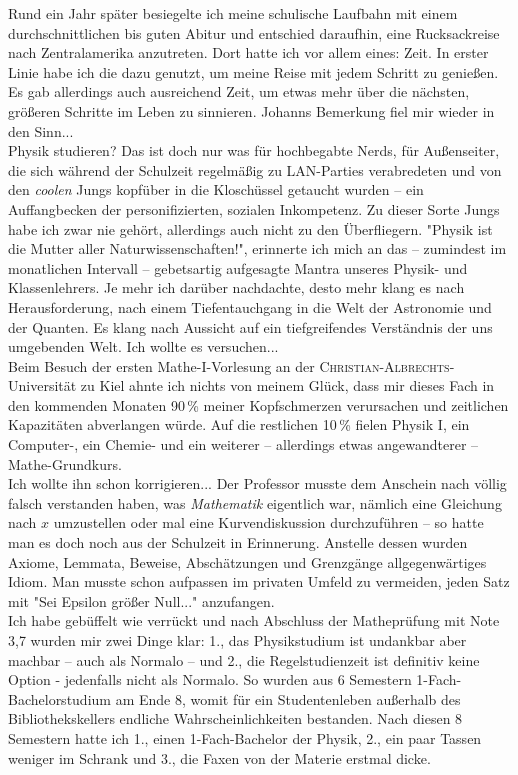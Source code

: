 \begin{multicols}{2}
Rund ein Jahr später besiegelte ich meine schulische Laufbahn mit einem durchschnittlichen bis guten Abitur und entschied daraufhin,
eine Rucksackreise nach Zentralamerika anzutreten.
Dort hatte ich vor allem eines: Zeit. In erster Linie habe ich die dazu genutzt, um meine Reise mit jedem Schritt zu genießen.
Es gab allerdings auch ausreichend Zeit, um etwas mehr über die nächsten, größeren Schritte im Leben zu sinnieren. Johanns Bemerkung fiel mir wieder in den Sinn... \\ 

Physik studieren? Das ist doch nur was für hochbegabte Nerds, für Außenseiter, die sich während der Schulzeit regelmäßig zu LAN-Parties verabredeten und 
von den \textit{coolen} Jungs kopfüber in die Kloschüssel getaucht wurden -- ein Auffangbecken der personifizierten, sozialen Inkompetenz.
Zu dieser Sorte Jungs habe ich zwar nie gehört, allerdings auch nicht zu den Überfliegern.
"Physik ist die Mutter aller Naturwissenschaften!", erinnerte ich mich an das – zumindest im monatlichen Intervall – gebetsartig aufgesagte Mantra unseres
Physik- und Klassenlehrers. Je mehr ich darüber nachdachte, desto mehr klang es nach Herausforderung,
nach einem Tiefentauchgang in die Welt der Astronomie und der Quanten.
Es klang nach Aussicht auf ein tiefgreifendes Verständnis der uns umgebenden Welt. Ich wollte es versuchen... \\ 

Beim Besuch der ersten Mathe-\textsc{I}-Vorlesung an der \textsc{Christian-Albrechts}-Universität zu Kiel ahnte ich nichts von meinem Glück, dass mir dieses Fach in den kommenden Monaten 90\,\% meiner Kopfschmerzen
verursachen und zeitlichen Kapazitäten abverlangen würde.
Auf die restlichen 10\,\% fielen Physik \textsc{I}, ein Computer-, ein Chemie- und ein weiterer – allerdings etwas angewandterer – Mathe-Grundkurs. \\ 

Ich wollte ihn schon korrigieren... Der Professor musste dem Anschein nach völlig falsch verstanden haben, was \textit{Mathematik} eigentlich war,
nämlich eine Gleichung nach $x$ umzustellen oder mal eine Kurvendiskussion durchzuführen – so hatte man es doch noch aus der Schulzeit in Erinnerung.
Anstelle dessen wurden Axiome, Lemmata, Beweise, Abschätzungen und Grenzgänge allgegenwärtiges Idiom.
Man musste schon aufpassen im privaten Umfeld zu vermeiden, jeden Satz mit "Sei Epsilon größer Null..." anzufangen. \\ 

Ich habe gebüffelt wie verrückt und nach Abschluss der Matheprüfung mit Note 3,7 wurden mir zwei Dinge klar: 1., das Physikstudium ist undankbar aber
machbar – auch als Normalo – und 2., die Regelstudienzeit ist definitiv keine Option - jedenfalls nicht als Normalo.
So wurden aus 6 Semestern 1-Fach-Bachelorstudium am Ende 8, womit für ein Studentenleben außerhalb des
Bibliothekskellers endliche Wahrscheinlichkeiten bestanden. Nach diesen 8 Semestern hatte ich 1., einen 1-Fach-Bachelor der Physik, 2., ein paar Tassen weniger im
Schrank und 3., die Faxen von der Materie erstmal dicke. \\ 


\end{multicols}
